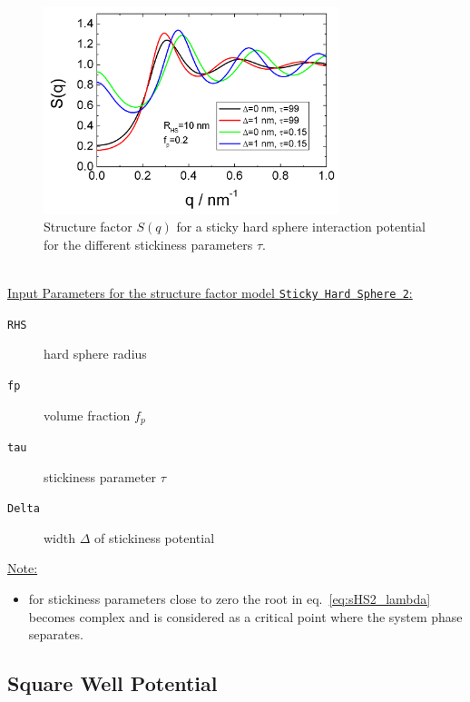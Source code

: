 \begin{figure}[htb]
\begin{center}
\includegraphics[width=0.768\textwidth]{../images/structure_factor/HardSphere/StickyHardSphere2.png}
\end{center}
\caption{Structure factor $S(q)$ for a sticky hard sphere interaction potential for the different
stickiness parameters $\tau$.}
\label{fig:SQStickyHardSphere2}
\end{figure}

~\\
\uline{Input Parameters for the structure factor model \texttt{Sticky Hard Sphere 2}:}
\begin{description}
\item[\texttt{RHS}] hard sphere radius
\item[\texttt{fp}] volume fraction $f_p$
\item[\texttt{tau}] stickiness parameter $\tau$
\item[\texttt{Delta}] width $\Delta$ of stickiness potential
\end{description}

\noindent\uline{Note:}
\begin{itemize}
\item for stickiness parameters close to zero the root in eq.\ \ref{eq:sHS2_lambda} becomes complex and is considered as a critical point where the system phase separates.
\end{itemize}


\subsection{Square Well Potential}  ~\\

